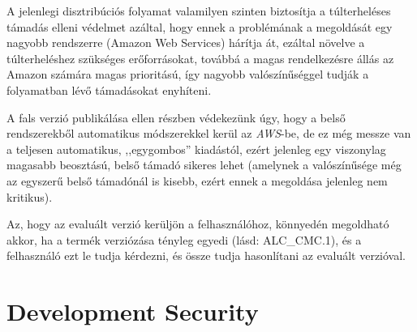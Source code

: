 A jelenlegi disztribúciós folyamat valamilyen szinten biztosítja a túlterheléses támadás elleni
védelmet azáltal, hogy ennek a problémának a megoldását egy nagyobb rendszerre (Amazon Web Services)
hárítja át, ezáltal növelve a túlterheléshez szükséges erőforrásokat, továbbá a magas rendelkezésre
állás az Amazon számára magas prioritású, így nagyobb valószínűséggel tudják a folyamatban lévő
támadásokat enyhíteni.

A fals verzió publikálása ellen részben védekezünk úgy, hogy a belső rendszerekből automatikus
módszerekkel kerül az \emph{AWS}-be, de ez még messze van a teljesen automatikus, ,,egygombos''
kiadástól, ezért jelenleg egy viszonylag magasabb beosztású, belső támadó sikeres lehet (amelynek a
valószínűsége még az egyszerű belső támadónál is kisebb, ezért ennek a megoldása jelenleg nem
kritikus).

Az, hogy az evaluált verzió kerüljön a felhasználóhoz, könnyedén megoldható akkor, ha a termék
verziózása tényleg egyedi (lásd: ALC\_CMC.1), és a felhasználó ezt le tudja kérdezni, és össze
tudja hasonlítani az evaluált verzióval.

\section{Development Security}


